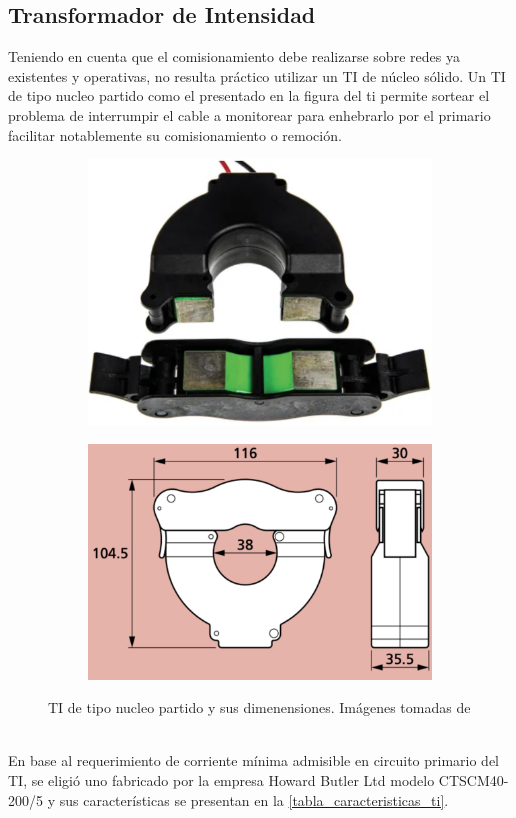 \subsection{Transformador de Intensidad}
Teniendo en cuenta que el comisionamiento debe realizarse sobre redes ya existentes y operativas, no resulta práctico utilizar un TI de núcleo sólido. Un TI de tipo nucleo partido como el presentado en la figura del ti  permite sortear el problema de interrumpir el cable a monitorear para enhebrarlo por el primario facilitar notablemente su comisionamiento o remoción.\\
\begin{figure}[h!]
	\centering
	\begin{subfigure}[b]{0.4\textwidth}
		\centering
		\includegraphics[width=.7\textwidth]{./Figures/ti_abierto}
		\caption{}
		\label{fig:ti_abierto}
	\end{subfigure}
	\centering
	\begin{subfigure}[b]{0.4\textwidth}
		\centering
		\includegraphics[width=.7\textwidth]{./Figures/ti_dimensiones}
		\caption{}
		\label{fig:ti_dimensiones}
	\end{subfigure}
	\caption{TI de tipo nucleo partido y sus dimenensiones. Imágenes tomadas de \citep{ct_hobut}}
	\label{fig:ti_mosaico}
\end{figure}\\
En base al requerimiento de corriente mínima admisible en circuito primario del TI, se eligió uno fabricado por la empresa Howard Butler Ltd modelo CTSCM40-200/5 y sus características se presentan en la \ref{tabla_caracteristicas_ti}.\\ 

